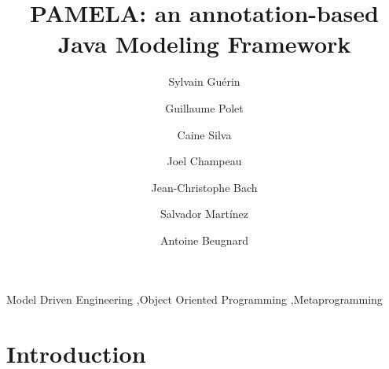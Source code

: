 \documentclass[preprint]{elsarticle}
\begin{document}
\begin{frontmatter}

\title{PAMELA: an annotation-based Java Modeling Framework}



\author[mymainaddress]{Sylvain Guérin}

\author[mymainaddress]{Guillaume Polet}

\author[mymainaddress]{Caine Silva}

\author[mymainaddress]{Joel Champeau}

\author[mysecondaryaddress]{Jean-Christophe Bach}

\author[mysecondaryaddress]{Salvador Mart\'inez}

\author[mysecondaryaddress]{Antoine Beugnard}

\address[mymainaddress]{ENSTA Bretagne, Lab-STICC, UMR 6285, Brest, France}%
\address[mysecondaryaddress]{IMT Atlantique, Lab-STICC, UMR 6285, F-29238 Brest, France}





\begin{keyword}
Model Driven Engineering \sep Object Oriented Programming \sep Metaprogramming 
\end{keyword}

\end{frontmatter}


\section{Introduction}
\label{sec:introduction}

\end{document}
